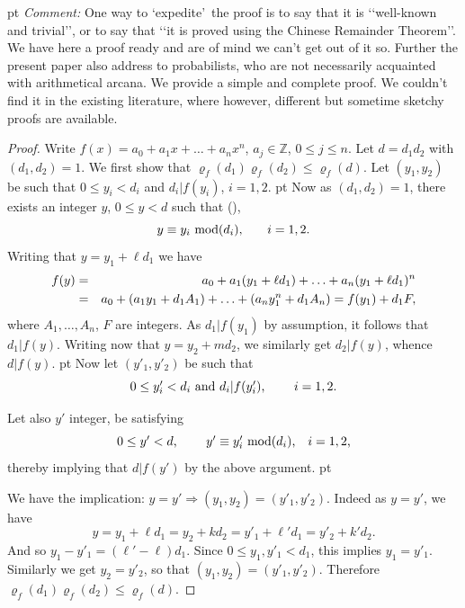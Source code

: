 \documentclass[11pt,draft,reqno]{amsart}
\theoremstyle{definition}
\theoremstyle{remarks}
\numberwithin{equation}{section}
\def \noi{{\noindent}}
\def \qq{{\qquad}}
\def\Z{{\mathbb Z}}
\begin{document}
 pt 
\noi   {\it Comment:}  One way to \lq expedite\rq \, the proof is to say that it is \lq\lq well-known and trivial\rq\rq, or to say that \lq\lq it is proved using the Chinese Remainder Theorem\rq\rq. We have here a proof ready and  are of mind we can't get out of it so. Further the present paper also address to probabilists, who are not necessarily    acquainted  with  arithmetical arcana.   
 We provide a simple and complete proof. We couldn't find it in the existing literature,  where however,  different but sometime sketchy proofs are  available.
  \begin{proof}
  Write $f(x)= a_0+a_1x+\ldots + a_nx^n$, $a_j\in \Z$, $0\le j\le n$. Let $d=d_1d_2$ with $(d_1,d_2)=1$. We first
show that
$\varrho_f(d_1)\varrho_f(d_2)\le
\varrho_f(d )$. Let
$(y_1, y_2)$ be such that $0\le y_i<d_i$ and   $d_i|f(y_i)$, $i=1,2$. 
 pt
Now as $(d_1,d_2)=1$,   there exists an 
 integer $y$, $0\le y<d$ such that (\cite[Th.\,59]{HW}),
\begin{equation}\label{equiv}\hbox{$y\equiv y_i\  {\rm mod}(d_i)$,\qq$i=1,2$.}
\end{equation}
Writing that  $y=y_1+\ell d_1$ we have
 \begin{eqnarray*}f(y)&=& a_0+a_1(y_1+\ell d_1)+\ldots + a_n(y_1+\ell d_1)^n \cr & =&a_0+(a_1 y_1+d_1 A_1  ) +\ldots + (a_n y_1^n +  d_1A_n)=
f(y_1)+ d_1 F ,
\end{eqnarray*}
where $A_1, \ldots, A_n$, $F $ are integers. As   $d_1|f(y_1)$ by assumption, it follows that   $d_1|f(y)$. Writing now that  $y=y_2+m d_2$, we similarly get  $d_2|f(y)$, whence $d|f(y)$. 
 pt
Now let $(y'_1, y'_2)$ be such that
$$\hbox{$0\le y'_i<d_i$ and   
$d_i|f(y'_i)$, \qq $i=1,2$.}$$ 

Let also $y'$ integer, be 
  satisfying 
$$\hbox{$0\le y'<d$, \qq $y'\equiv
y'_i\  {\rm mod}(d_i)$,\quad $i=1,2$,}$$ 
   thereby implying that  $d|f(y')$ by the above argument. 
 pt
 
 We have the implication: $y=y'\Rightarrow (y_1, y_2)=(y'_1, y'_2)$. Indeed as $y=y'$,  we have
$$y= y_1+\ell d_1=y_2+k d_2=y'_1+\ell' d_1=y'_2+k' d_2.$$
And so $y_1-y'_1=  (\ell'-\ell) d_1$. Since $0\le y_1, y'_1<d_1$, this implies $y_1=y'_1$. Similarly we get $y_2=y'_2$, so that $(y_1,
y_2)=(y'_1, y'_2)$. 
Therefore $\varrho_f(d_1)\varrho_f(d_2)\le
\varrho_f(d )$. 


\end{proof}
\end{document}
